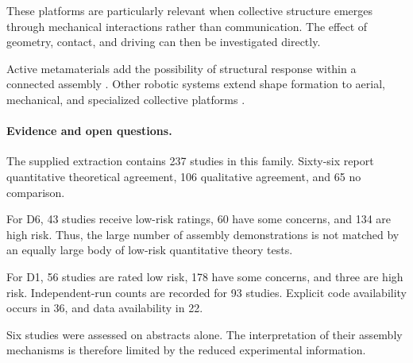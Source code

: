 These platforms are particularly
relevant when collective
structure emerges through
mechanical interactions
rather than communication.
The effect of geometry,
contact, and driving
can then be investigated
directly.

Active metamaterials add
the possibility of
structural response
within a connected
assembly
\cite{Rezanejad2025programmableentangl,Du2026metamaterialsthatl}.
Other robotic systems
extend shape formation
to aerial, mechanical,
and specialized
collective platforms
\cite{Beaver2022aconstraintdriven,Li2025llmflockdecentral,PitaRomero2026flockingbehaviorfo,Bo2026threephasesofodd,Mizuguchi2004collectivedynamics,Yang2025electronicfreepart,Infanti2026formationcontrolwi,Zoss2018distributedsystemo,Cabral2023designofadecentra,Virgh2014flockingalgorithmf,Petrek2020bioinspiredcompact,Novk2021fastcollectiveevas,Warmington2026adiscontinuouslyco,Zhou2022lateralcontactyiel,Fu2023tabletopplatformo,Delight2016developingrobotics,Albani2022distributedthreedi,Fernando2021onlineflockingcont,Berlinger2021selforganizedevasi,Brandstatter2024flockformationcont,Yu2024grfbasedpredictive,Vsrhelyi2014outdoorflockingand,Zhang2022agileformationcont,Horyna2024fastswarmingofuav,Silveria2026decentralizedswarm,Nilles2019ahardwareandsoftw,Vallegra2018gradualcollectiveu,Iskandarani2014unmannedaerialvehi,Jia2015leaderfollowerfloc,Iwami2024astudyonanalysis,MendozaRobles2026distributedformatio}.

\paragraph*{Evidence and open questions.}

The supplied extraction contains
237 studies in this family.
Sixty-six report quantitative
theoretical agreement,
106 qualitative agreement,
and 65 no comparison.

For D6, 43 studies
receive low-risk
ratings, 60 have
some concerns,
and 134 are high risk.
Thus, the large number
of assembly demonstrations
is not matched by
an equally large body
of low-risk quantitative
theory tests.

For D1, 56 studies
are rated low risk,
178 have some concerns,
and three are high risk.
Independent-run counts
are recorded for 93 studies.
Explicit code availability
occurs in 36,
and data availability
in 22.

Six studies were
assessed on abstracts
alone. The interpretation
of their assembly
mechanisms is therefore
limited by the reduced
experimental information.

